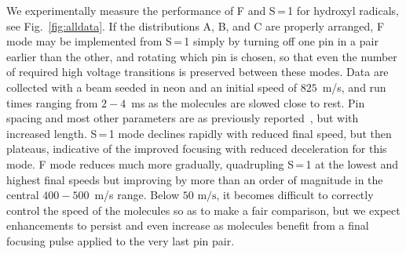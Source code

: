 \documentclass[%
 reprint,
 amsmath,amssymb,
 aps,
prl,
]{revtex4-1}
\begin{document}
We experimentally measure the performance of F and S\,=\,1 for hydroxyl radicals, see Fig.~\ref{fig:alldata}.
If the distributions A, B, and C are properly arranged, F mode may be implemented from S\,=\,1 simply by turning off one pin in a pair earlier than the other, and rotating which pin is chosen, so that even the number of required high voltage transitions is preserved between these modes.
Data are collected with a beam seeded in neon and an initial speed of $825$~m/s, and run times ranging from $2-4$~ms as the molecules are slowed close to rest.
Pin spacing and most other parameters are as previously reported~\cite{Bochinski2004,Sawyer2007}, but with increased length.
S\,=\,1 mode declines rapidly with reduced final speed, but then plateaus, indicative of the improved focusing with reduced deceleration for this mode.
F mode reduces much more gradually, quadrupling S\,=\,1 at the lowest and highest final speeds but improving by more than an order of magnitude in the central $400-500$~m/s range.
Below $50\text{ m/s}$, it becomes difficult to correctly control the speed of the molecules so as to make a fair comparison, but we expect enhancements to persist and even increase as molecules benefit from a final focusing pulse applied to the very last pin pair.
\end{document}
